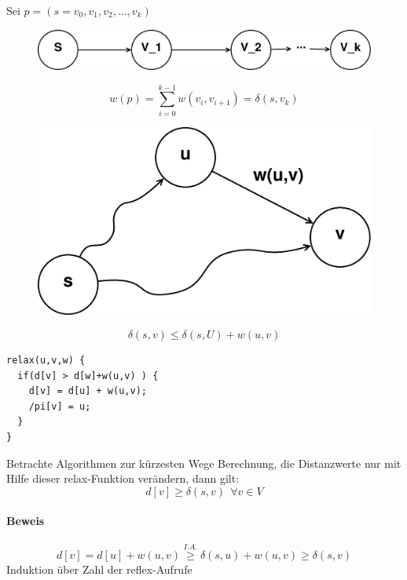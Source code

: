 Sei $p=(s=v_0,v_1,v_2,\ldots,v_k)$
\begin{figure}[h]
	\centering
	\includegraphics[width=0.3\linewidth]{16/Grafik/Dijkstra2}
	\caption{}
	\label{fig:Dijkstra2}
	\end{figure}
\[ w(p) = \sum_{i=0}^{k-1}w(v_i,v_{i+1})=\delta(s,v_k) \]
\begin{figure}[h]
	\centering
	\includegraphics[width=0.3\linewidth]{16/Grafik/dijkstra3}
	\caption{}
	\label{fig:Dijkstra3}
	\end{figure}
\[ \delta(s,v)\leq \delta(s,U)+w(u,v) \]
\begin{lstlisting}
relax(u,v,w) {
  if(d[v] > d[w]+w(u,v) ) {
    d[v] = d[u] + w(u,v);
    /pi[v] = u;
  }
}
\end{lstlisting}
Betrachte Algorithmen zur kürzesten Wege Berechnung, die Distanzwerte nur mit Hilfe dieser relax-Funktion verändern, dann gilt:
\[ d[v] \geq \delta(s,v)~~\forall v\in V \]
\paragraph{Beweis}
\[ d[v] = d[u]+w(u,v) \overset{I.A.}{\geq} \delta(s,u)+w(u,v) \geq \delta(s,v) \]
Induktion über Zahl der reflex-Aufrufe